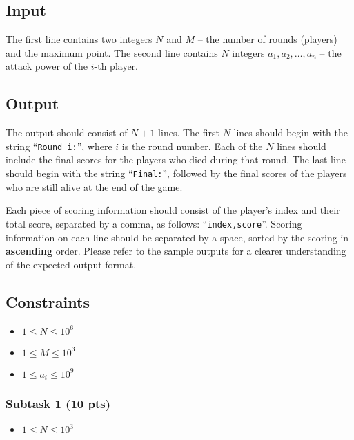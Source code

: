 \subsection{Input}\label{input}

The first line contains two integers $N$ and $M$ -- the number of rounds (players) and the maximum point. 
The second line contains $N$ integers $a_1, a_2, \dots, a_n$ -- the attack power of the $i$-th player.

\subsection{Output}\label{output}

The output should consist of $N+1$ lines. 
The first $N$ lines should begin with the string ``\texttt{Round i:}'', where $i$ is the round number. 
Each of the $N$ lines should include the final scores for the players who died during that round. 
The last line should begin with the string ``\texttt{Final:}'', followed by the final scores of the players who are still alive at the end of the game.

Each piece of scoring information should consist of the player's index and their total score, separated by a comma, as follows: ``\texttt{index,score}''. 
Scoring information on each line should be separated by a space, sorted by the scoring in \textbf{ascending} order.
Please refer to the sample outputs for a clearer understanding of the expected output format. 

\subsection{Constraints} \label{constraint}
\begin{itemize}
\tightlist
    \item $1 \le N \le 10^6$
    \item $1 \le M \le 10^3$
    \item $1 \le a_i \le 10^9$
\end{itemize}

\subsubsection{Subtask 1 (10 pts)}\label{subtask-1}

\begin{itemize}
\tightlist
\item $1 \le N \le 10^3$
\end{itemize}

